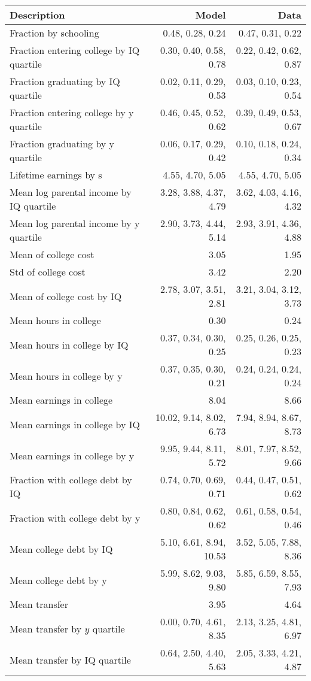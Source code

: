 \begin{tabular}{lrr}
\hline
Description & Model  & Data  \\
\hline
Fraction by schooling & 0.48, 0.28, 0.24  & 0.47, 0.31, 0.22  \\
Fraction entering college by IQ quartile & 0.30, 0.40, 0.58, 0.78  & 0.22, 0.42, 0.62, 0.87  \\
Fraction graduating by IQ quartile & 0.02, 0.11, 0.29, 0.53  & 0.03, 0.10, 0.23, 0.54  \\
Fraction entering college by y quartile & 0.46, 0.45, 0.52, 0.62  & 0.39, 0.49, 0.53, 0.67  \\
Fraction graduating by y quartile & 0.06, 0.17, 0.29, 0.42  & 0.10, 0.18, 0.24, 0.34  \\
Lifetime earnings by s & 4.55, 4.70, 5.05  & 4.55, 4.70, 5.05  \\
Mean log parental income by IQ quartile & 3.28, 3.88, 4.37, 4.79  & 3.62, 4.03, 4.16, 4.32  \\
Mean log parental income by y quartile & 2.90, 3.73, 4.44, 5.14  & 2.93, 3.91, 4.36, 4.88  \\
Mean of college cost & 3.05  & 1.95  \\
Std of college cost & 3.42  & 2.20  \\
Mean of college cost by IQ & 2.78, 3.07, 3.51, 2.81  & 3.21, 3.04, 3.12, 3.73  \\
Mean hours in college & 0.30  & 0.24  \\
Mean hours in college by IQ & 0.37, 0.34, 0.30, 0.25  & 0.25, 0.26, 0.25, 0.23  \\
Mean hours in college by y & 0.37, 0.35, 0.30, 0.21  & 0.24, 0.24, 0.24, 0.24  \\
Mean earnings in college & 8.04  & 8.66  \\
Mean earnings in college by IQ & 10.02, 9.14, 8.02, 6.73  & 7.94, 8.94, 8.67, 8.73  \\
Mean earnings in college by y & 9.95, 9.44, 8.11, 5.72  & 8.01, 7.97, 8.52, 9.66  \\
Fraction with college debt by IQ & 0.74, 0.70, 0.69, 0.71  & 0.44, 0.47, 0.51, 0.62  \\
Fraction with college debt by y & 0.80, 0.84, 0.62, 0.62  & 0.61, 0.58, 0.54, 0.46  \\
Mean college debt by IQ & 5.10, 6.61, 8.94, 10.53  & 3.52, 5.05, 7.88, 8.36  \\
Mean college debt by y & 5.99, 8.62, 9.03, 9.80  & 5.85, 6.59, 8.55, 7.93  \\
Mean transfer & 3.95  & 4.64  \\
Mean transfer by $y$ quartile & 0.00, 0.70, 4.61, 8.35  & 2.13, 3.25, 4.81, 6.97  \\
Mean transfer by IQ quartile & 0.64, 2.50, 4.40, 5.63  & 2.05, 3.33, 4.21, 4.87  \\
\hline
\end{tabular}%
